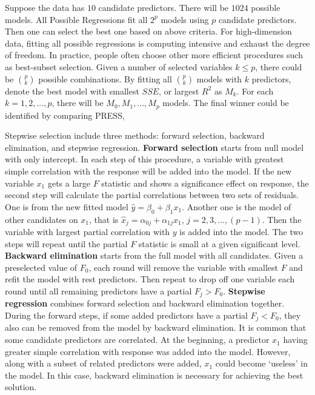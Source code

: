 \documentclass[
  11pt,
  openany]{memoir}
\begin{document}
Suppose the data has \(10\) candidate predictors. There will be \(1024\) possible models.
All Possible Regressions fit all \(2^p\) models using \(p\) candidate predictors. Then one can select the best one based on above criteria.
For high-dimension data, fitting all possible regressions is computing intensive and exhaust the degree of freedom.
In practice, people often choose other more efficient procedures such as best-subset selection. Given a number of selected variables \(k\le p\), there could be \(p\choose k\) possible combinations. By fitting all \(p\choose k\) models with \(k\) predictors, denote the best model with smallest \(SSE\), or largest \(R^2\) as \(M_k\).
For each \(k=1,2,...,p\), there will be \(M_0,M_1,...,M_p\) models. The final winner could be identified by comparing PRESS,

Stepwise selection include three methods: forward selection, backward elimination, and stepwise regression.
\textbf{Forward selection} starts from null model with only intercept. In each step of this procedure, a variable with greatest simple correlation with the response will be added into the model. If the new variable \(x_1\) gets a large \(F\) statistic and shows a significance effect on response, the second step will calculate the partial correlations between two sets of residuals. One is from the new fitted model \(\hat y=\beta_0+\beta_1x_1\). Another one is the model of other candidates on \(x_1\), that is \(\hat x_j=\alpha_{0j}+\alpha_{1j}x_1\), \(j=2,3,...,(p-1)\). Then the variable with largest partial correlation with \(y\) is added into the model.
The two steps will repeat until the partial \(F\) statistic is small at a given significant level.
\textbf{Backward elimination} starts from the full model with all candidates.
Given a preselected value of \(F_0\), each round will remove the variable with smallest \(F\) and refit the model with rest predictors.
Then repeat to drop off one variable each round until all remaining predictors have a partial \(F_j>F_0\).
\textbf{Stepwise regression} combines forward selection and backward elimination together. During the forward steps, if some added predictors have a partial \(F_j<F_0\), they also can be removed from the model by backward elimination.
It is common that some candidate predictors are correlated.
At the beginning, a predictor \(x_1\) having greater simple correlation with response was added into the model.
However, along with a subset of related predictors were added, \(x_1\) could become `useless' in the model. In this case, backward elimination is necessary for achieving the best solution.
\end{document}
